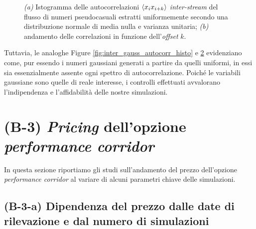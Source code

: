 \begin{figure}[t]
\begin{subfigure}{.5\textwidth}
  \caption{}
  \label{fig:inter_gauss_autocorr_offset}
\end{subfigure}
\caption[Istogramma e andamento delle autocorrelazioni \textit{inter-stream} del flusso di numeri pseudocasuali estratti uniformemente secondo una distribuzione normale di media nulla e varianza unitaria.]{\textit{(a)} Istogramma delle autocorrelazioni $\braket{x_i x_{i+k}}$ \textit{inter-stream} del flusso di numeri pseudocasuali estratti uniformemente secondo una distribuzione normale di media nulla e varianza unitaria; \textit{(b)} andamento delle correlazioni in funzione dell'\textit{offset} $k$.}
\end{figure}

Tuttavia, le analoghe Figure \ref{fig:inter_gauss_autocorr_histo} e \ref{fig:inter_gauss_autocorr_offset} evidenziano come, pur essendo i numeri gaussiani generati a partire da quelli uniformi, in essi sia essenzialmente assente ogni spettro di autocorrelazione. Poiché le variabili gaussiane sono quelle di reale interesse, i controlli effettuati avvalorano l'indipendenza e l'affidabilità delle nostre simulazioni.

\section{(B-3) \textit{Pricing} dell'opzione \textit{performance corridor}} \label{sec:pc_pricing}
In questa sezione riportiamo gli studi sull'andamento del prezzo dell'opzione \textit{performance corridor} al variare di alcuni parametri chiave delle simulazioni.

\subsection{(B-3-a) Dipendenza del prezzo dalle date di rilevazione e dal numero di simulazioni}

